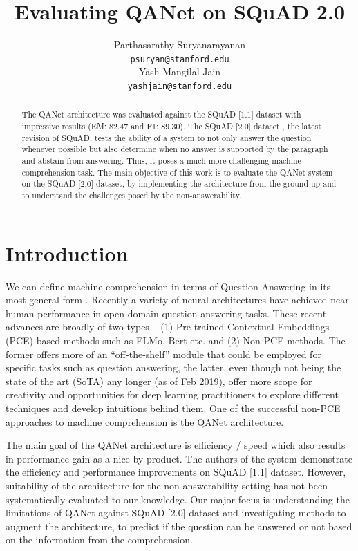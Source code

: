 \documentclass{article}
\title{Evaluating QANet on SQuAD 2.0}
\author{%
  Parthasarathy Suryanarayanan\\
   \texttt{psuryan@stanford.edu} \\
  \And
  Yash Mangilal Jain\\
  \texttt{yashjain@stanford.edu} \\
}
\begin{document}

\maketitle

\begin{abstract}
\small
The QANet architecture \cite{yu2018qanet} was evaluated against the SQuAD [1.1] dataset \citep{rajpurkar2016squad} with impressive results (EM: 82.47 and F1: 89.30). The SQuAD [2.0] dataset \cite{rajpurkar2018know}, the latest revision of SQuAD, tests the ability of a system to not only answer the question whenever possible but also determine when no answer is supported by the paragraph and abstain from answering. Thus, it poses a much more challenging machine comprehension task. The main objective of this work is to evaluate the QANet system on  the SQuAD [2.0] dataset, by implementing the architecture from the ground up and to understand the challenges posed by the non-answerability. 
\end{abstract}

\section{Introduction}
\small
We can define machine comprehension in terms of Question Answering in its most general form \cite{burges2013towards}.  Recently a variety of neural architectures have achieved near-human performance in open domain question answering tasks. These recent advances are broadly of two types – (1) Pre-trained Contextual Embeddings (PCE) based methods such as ELMo\cite{peters2018deep}, Bert\cite{devlin2018bert} etc. and (2) Non-PCE methods. The former offers more of an “off-the-shelf” module that could be employed for specific tasks such as question answering, the latter, even though not being the state of the art (SoTA) any longer (as of Feb 2019), offer more scope for creativity and opportunities for deep learning practitioners to explore different techniques and develop intuitions behind them. One of the successful non-PCE approaches to machine comprehension is the QANet architecture.  

The main goal of the QANet architecture is efficiency / speed which also results in performance gain as a nice by-product. The authors of the system demonstrate the efficiency and performance improvements on SQuAD [1.1] dataset. However, suitability of the architecture for the non-answerability setting has not been systematically evaluated to our knowledge. Our major focus is understanding the limitations of QANet against SQuAD [2.0] dataset and investigating methods to augment the architecture, to predict if the question can be answered or not based on the information from the comprehension.
\end{document}
